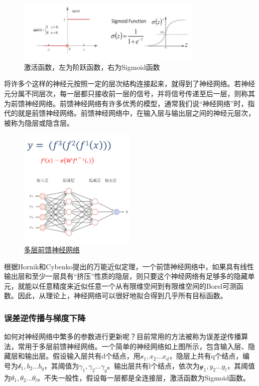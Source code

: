 \documentclass[UTF8,a4paper，12pt]{article}
\def\MC {\mathcal}
\theoremstyle{theorem}
\theoremstyle{definition}
\begin{document}
\begin{figure}[htbp]
	\centering
	\includegraphics[width=0.8\textwidth]{assets/05}
	\caption{激活函数，左为阶跃函数，右为Sigmoid函数}
\end{figure}

将许多个这样的神经元按照一定的层次结构连接起来，就得到了神经网络。若神经元分属不同层次，每一层都只接收前一层的信号，并将信号传递至后一层，则称其为前馈神经网络。前馈神经网络有许多优秀的模型，通常我们说“神经网络”时，指代的就是前馈神经网络。前馈神经网络中，在输入层与输出层之间的神经元层次，被称为隐层或隐含层。

\begin{figure}[htbp]
	\centering
	\includegraphics[width=0.5\textwidth]{assets/06}
	\caption{\href{https://nndl.github.io/nndl-book.pdf}{多层前馈神经网络}}
\end{figure}

根据Hornik和Cybenko提出的万能近似定理，一个前馈神经网络中，如果具有线性输出层和至少一层具有“挤压”性质的隐层，则只要这个神经网络有足够多的隐藏单元，就能以任意精度来近似任意一个从有限维空间到有限维空间的Borel可测函数。因此，从理论上，神经网络可以很好地拟合得到几乎所有目标函数。

\subsubsection{误差逆传播与梯度下降}

如何对神经网络中繁多的参数进行更新呢？目前常用的方法被称为误差逆传播算法，常用于多层前馈神经网络。一个简单的神经网络如上图所示，包含输入层、隐藏层和输出层。假设输入层共有d个结点，用$\MC x_1,x_2...x_d$，隐层上共有q个结点，编号为$\MC b_1,b_2...b_q$，其阈值为$\gamma_1,\gamma_2...\gamma_q$。输出层共有l个结点，依次为$\MC y_1,y_2...y_l$，其阈值为$\theta_1,\theta_2...\theta_l$。不失一般性，假设每一层都是全连接层，激活函数为Sigmoid函数。
\end{document}
